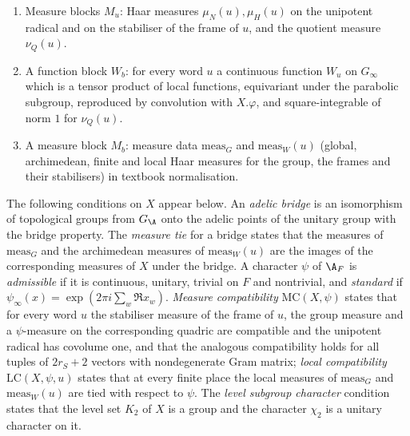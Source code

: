 \begin{definition}
\begin{enumerate}[label=(\alph*)]
  tensor products of local representations of Harish-Chandra type prescribed by $D$, with orthonormal frames.
\item Measure blocks $M_u$: Haar measures $\mu_N(u),\mu_H(u)$ on the unipotent radical and on the stabiliser of the
  frame of $u$, and the quotient measure $\nu_Q(u)$.
\item A function block $W_b$: for every word $u$ a continuous function $W_u$ on $G_\infty$ which is a tensor product of
  local functions, equivariant under the parabolic subgroup, reproduced by convolution with $X.\varphi$, and
  square-integrable of norm $1$ for $\nu_Q(u)$.
\item A measure block $M_b$: measure data $\mathrm{meas}_G$ and $\mathrm{meas}_W(u)$ (global, archimedean, finite and
  local Haar measures for the group, the frames and their stabilisers) in textbook normalisation.
\end{enumerate}
The following conditions on $X$ appear below. An \emph{adelic bridge} is an isomorphism of topological groups from
$G_{\A}$ onto the adelic points of the unitary group with the bridge property. The \emph{measure tie} for a bridge
states that the measures of $\mathrm{meas}_G$ and the archimedean measures of $\mathrm{meas}_W(u)$ are the images of
the corresponding measures of $X$ under the bridge. A character $\psi$ of $\A_F$ is \emph{admissible} if it is
continuous, unitary, trivial on $F$ and nontrivial, and \emph{standard} if
$\psi_\infty(x)=\exp(2\pi i\sum_w\Re x_w)$. \emph{Measure compatibility} $\mathrm{MC}(X,\psi)$ states that for every
word $u$ the stabiliser measure of the frame of $u$, the group measure and a $\psi$-measure on the corresponding
quadric are compatible and the unipotent radical has covolume one, and that the analogous compatibility holds for all
tuples of $2r_S+2$ vectors with nondegenerate Gram matrix; \emph{local compatibility} $\mathrm{LC}(X,\psi,u)$ states
that at every finite place the local measures of $\mathrm{meas}_G$ and $\mathrm{meas}_W(u)$ are tied with respect to
$\psi$. The \emph{level subgroup character} condition states that the level set $K_2$ of $X$ is a group and the
character $\chi_2$ is a unitary character on it.
%
%
%
\end{definition}

